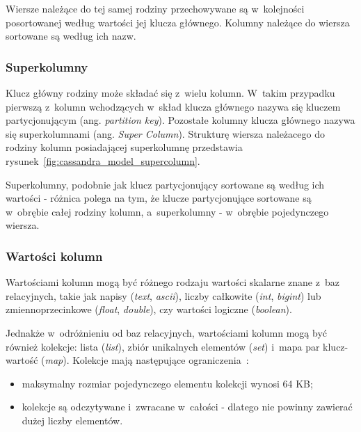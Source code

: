 

Wiersze należące do tej samej rodziny przechowywane są w~kolejności posortowanej według wartości jej klucza głównego.
Kolumny należące do wiersza sortowane są według ich nazw.

\subsubsection{Superkolumny}

Klucz główny rodziny może składać się z~wielu kolumn.
W~takim przypadku pierwszą z~kolumn wchodzących w~skład klucza głównego nazywa się kluczem partycjonującym (ang. \emph{partition key}).
Pozostałe kolumny klucza głównego nazywa się superkolumnami (ang. \emph{Super Column}).
Strukturę wiersza należacego do rodziny kolumn posiadającej superkolumnę przedstawia rysunek~\ref{fig:cassandra_model_supercolumn}.



Superkolumny, podobnie jak klucz partycjonujący sortowane są według ich wartości - różnica polega na tym, że klucze partycjonujące sortowane są w~obrębie całej rodziny kolumn, a~superkolumny - w~obrębie pojedynczego wiersza.

\subsubsection{Wartości kolumn}

Wartościami kolumn mogą być różnego rodzaju wartości skalarne znane z~baz relacyjnych, takie jak napisy (\emph{text}, \emph{ascii}), liczby całkowite (\emph{int}, \emph{bigint}) lub zmiennoprzecinkowe (\emph{float}, \emph{double}), czy wartości logiczne (\emph{boolean}).

Jednakże w~odróżnieniu od baz relacyjnych, wartościami kolumn mogą być również kolekcje: lista (\emph{list}), zbiór unikalnych elementów (\emph{set}) i~mapa par klucz-wartość (\emph{map}).
Kolekcje mają następujące ograniczenia~\cite{cassandra:collections}:

\begin{itemize}
 \item maksymalny rozmiar pojedynczego elementu kolekcji wynosi 64 KB;
 \item kolekcje są odczytywane i~zwracane w~całości - dlatego nie powinny zawierać dużej liczby elementów.
\end{itemize}

